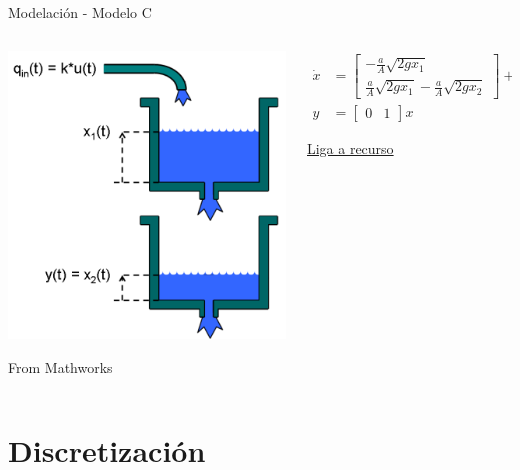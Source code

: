 \documentclass[presentation,aspectratio=1610]{beamer}
\begin{document}
\begin{frame}[label={sec:orgff1ee19}]{Modelación - Modelo \alert{C}}
\begin{columns}
\begin{column}{0.5\columnwidth}
\includegraphics[height=0.5\textheight]{../../figures/two-tank-mathworks.png}

{\footnotesize From Mathworks}
\end{column}

\begin{column}{0.5\columnwidth}
\begin{align*}
\dot{x} &= \begin{bmatrix} -\frac{a}{A} \sqrt{2gx_1}\\ \frac{a}{A}\sqrt{2gx_1} - \frac{a}{A}\sqrt{2gx_2}\end{bmatrix} + \begin{bmatrix}\frac{k}{A}\\0\end{bmatrix}u\\ 
y &= \begin{bmatrix} 0 & 1\end{bmatrix} x 
\end{align*}

\href{https://www.mathworks.com/help/ident/examples/two-tank-system-c-mex-file-modeling-of-time-continuous-siso-system.html}{Liga a recurso}
\end{column}
\end{columns}
\end{frame}

\section{Discretización}
\label{sec:org26f2aef}
\end{document}
